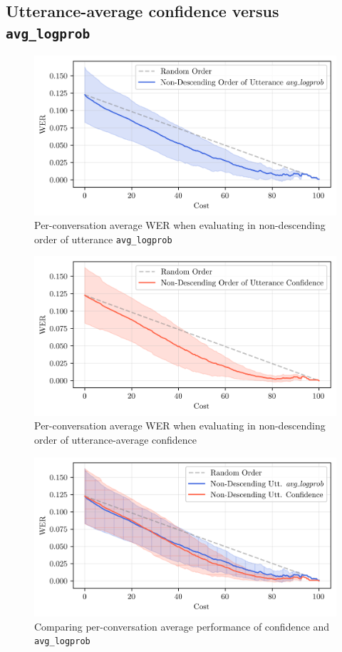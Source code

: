 \clearpage
\subsection{Utterance-average confidence versus \texttt{avg\_logprob}}\label{subsec:conf-vs-lprob}

\begin{figure}[h!]
 \caption{Per-conversation average WER when evaluating in non-descending order of utterance \texttt{avg\_logprob}}
 \label{fig:average-avg-logprob}
 \centering
 \includegraphics[width=\textwidth]{figures/average-avg-logprob.png}
\end{figure}
\begin{figure}[h!]
 \caption{Per-conversation average WER when evaluating in non-descending order of utterance-average confidence}
 \label{fig:average-uttconf}
 \includegraphics[width=\textwidth]{figures/average-uttconf.png}
 \centering
\end{figure}
\begin{figure}[p]
 \caption{Comparing per-conversation average performance of confidence and \texttt{avg\_logprob}}
 \label{fig:compare-avg-uttconf-vs-lprob}
 \includegraphics[width=\textwidth]{figures/compare-avg-uttconf-vs-lprob.png}
 \centering
\end{figure}
